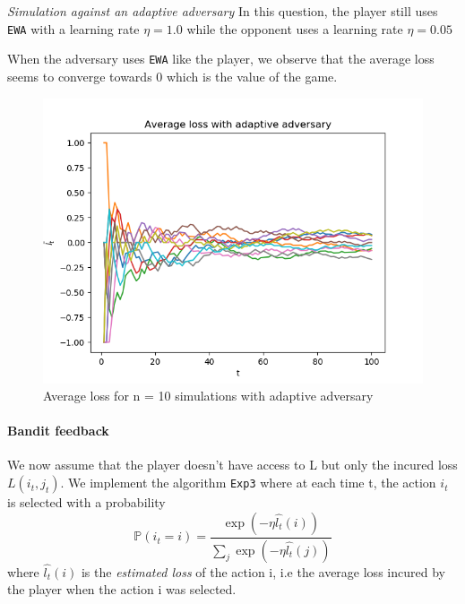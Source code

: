  \textit{Simulation against an adaptive adversary}
In this question, the player still uses \texttt{EWA} with a learning rate $\eta = 1.0$ while the opponent uses a learning rate $\eta = 0.05$

When the adversary uses \texttt{EWA} like the player, we observe that the average loss seems to converge towards 0 which is the value of the game.

\begin{figure}
	\includegraphics[width=\textwidth]{images/question4a}
	\caption{Average loss for n = 10 simulations with adaptive adversary}
	\label{fig:question4a}
\end{figure}

\begin{figure}[h!]
	\qquad
	\label{fig:question4b}
\end{figure}

\paragraph*{Bandit feedback} We now assume that the player doesn't have access to L but only the incured loss $L(i_t, j_t)$. We implement the algorithm \texttt{Exp3} where at each time t, the action $i_t$ is selected with a probability
$$
\mathbb{P}(i_t = i) = \frac{\exp{(- \eta \hat{l_t}(i))}}{\sum_j \exp{(- \eta \hat{l_t}(j))}}
$$
where $\hat{l_t}(i)$ is the \textit{estimated loss} of the action i, i.e the average loss incured by the player when the action i was selected. 